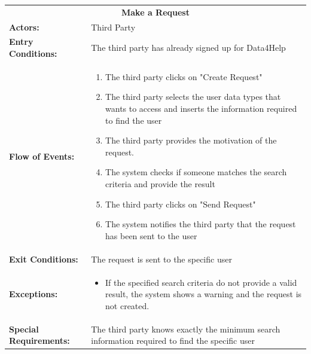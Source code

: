 \begin{table}[H]
	\centering
	{\renewcommand{\arraystretch}{1.5}%
		\begin{tabular}{|@{\hspace{2em}} p{4cm} @{}| p{11cm} @{\qquad}|}
			\cline{1-2}
			\multicolumn{2}{|c|}{\textbf{Make a Request}} \\ \cline{1-2}
			\textbf{Actors:} & Third Party \\ \cline{1-2}
			\textbf{Entry Conditions:} &  The third party has already signed up for Data4Help  \\ \cline{1-2}
			\textbf{Flow of Events:} & 
			\begin{enumerate}[itemsep=-0.2em, topsep=0em]
				\item The third party clicks on "Create Request"
				\item The third party selects the user data types that wants to access and inserts the information required to find the user
				\item The third party provides the motivation of the request.
				\item The system checks if someone matches the search criteria and provide the result
				\item The third party clicks on "Send Request"
				\item The system notifies the third party that the request has been sent to the user
			\end{enumerate}\\ \cline{1-2}
			\textbf{Exit Conditions:} & The request is sent to the specific user\\ \cline{1-2}
			\textbf{Exceptions:} & 
			\begin{itemize}[topsep=-2em, itemsep=-0.2em]
				\item If the specified search criteria do not provide a valid result, the system shows a warning and the request is not created.
			\end{itemize} \\ \cline{1-2}
			\textbf{Special Requirements:} & The third party knows exactly the minimum search information required to find the specific user \\ \hline
	\end{tabular}} \quad
\end{table}


